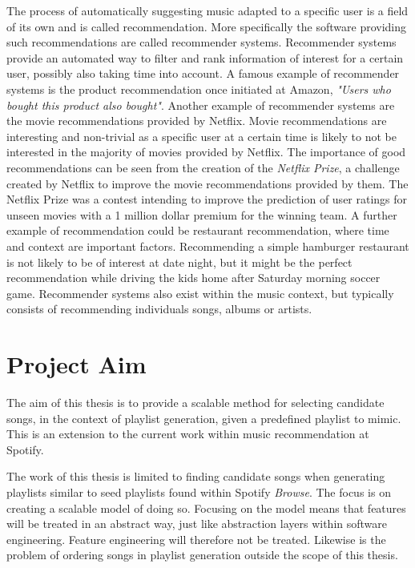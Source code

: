 \documentclass[a4paper,11pt]{kth-mag}
\begin{document}
The process of automatically suggesting music adapted to a specific user is a field of its own and is called recommendation. More specifically the software providing such recommendations are called recommender systems. Recommender systems provide an automated way to filter and rank information of interest for a certain user, possibly also taking time into account. A famous example of recommender systems is the product recommendation once initiated at Amazon, \textit{"Users who bought this product also bought"}. Another example of recommender systems are the movie recommendations provided by Netflix. Movie recommendations are interesting and non-trivial as a specific user at a certain time is likely to not be interested in the majority of movies provided by Netflix. The importance of good recommendations can be seen from the creation of the \textit{Netflix Prize}, a challenge created by Netflix to improve the movie recommendations provided by them. The Netflix Prize was a contest intending to improve the prediction of user ratings for unseen movies with a 1 million dollar premium for the winning team. A further example of recommendation could be restaurant recommendation, where time and context are important factors. Recommending a simple hamburger restaurant is not likely to be of interest at date night, but it might be the perfect recommendation while driving the kids home after Saturday morning soccer game. Recommender systems also exist within the music context, but typically consists of recommending individuals songs, albums or artists.

\section{Project Aim}
The aim of this thesis is to provide a scalable method for selecting candidate songs, in the context of playlist generation, given a predefined playlist to mimic. This is an extension to the current work within music recommendation at Spotify.  

The work of this thesis is limited to finding candidate songs when generating playlists similar to seed playlists found within Spotify \textit{Browse}. The focus is on creating a scalable model of doing so. Focusing on the model means that features will be treated in an abstract way, just like abstraction layers within software engineering. Feature engineering will therefore not be treated. Likewise is the problem of ordering songs in playlist generation outside the scope of this thesis. 
\end{document}
